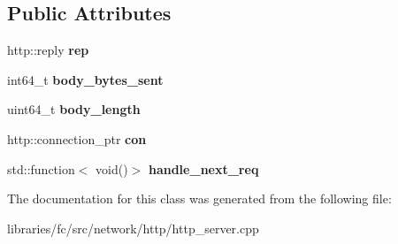 \subsection*{Public Attributes}
\begin{DoxyCompactItemize}
\item 
\mbox{\label{classfc_1_1http_1_1server_1_1response_1_1impl_a023a276012855b324066106ecbff5414}} 
http\+::reply {\bfseries rep}
\item 
\mbox{\label{classfc_1_1http_1_1server_1_1response_1_1impl_a92556cd05cca9072f44ef72ce02208a7}} 
int64\+\_\+t {\bfseries body\+\_\+bytes\+\_\+sent}
\item 
\mbox{\label{classfc_1_1http_1_1server_1_1response_1_1impl_a85c7628a82a1bca4159c07f6e99d4ccc}} 
uint64\+\_\+t {\bfseries body\+\_\+length}
\item 
\mbox{\label{classfc_1_1http_1_1server_1_1response_1_1impl_a76636c0fe906d084437ccd322acdbf52}} 
http\+::connection\+\_\+ptr {\bfseries con}
\item 
\mbox{\label{classfc_1_1http_1_1server_1_1response_1_1impl_a121d796635b77c06ebec27b8aeac4d6b}} 
std\+::function$<$ void()$>$ {\bfseries handle\+\_\+next\+\_\+req}
\end{DoxyCompactItemize}


The documentation for this class was generated from the following file\+:\begin{DoxyCompactItemize}
\item 
libraries/fc/src/network/http/http\+\_\+server.\+cpp\end{DoxyCompactItemize}
